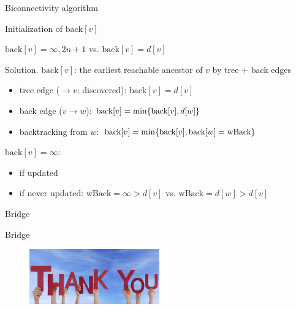 \begin{frame}{Biconnectivity algorithm}
  \begin{exampleblock}{Initialization of $\text{back}[v]$ }
    \begin{center}
      $\text{back}[v] = \infty, 2n+1$ vs. $\text{back}[v] = d[v]$
    \end{center}
  \end{exampleblock}

  \begin{block}{Solution.}
    $\text{back}[v]$: the earliest reachable ancestor of $v$ by tree + back edges
    \begin{itemize}
      \item tree edge ($\to v$; discovered): $\text{back}[v] = d[v]$
      \item back edge ($v \to w$): $\text{back}[v] = \min \{\text{back}[v], d[w]\}$
      \item backtracking from $w$: $\text{back}[v] = \min \{\text{back}[v], \text{back}[w] = \text{wBack}\}$
    \end{itemize}

    $\text{back}[v] = \infty$:
    \begin{itemize}
      \item if updated
      \item if never updated: $\text{wBack} = \infty > d[v]$ vs. $\text{wBack} = d[w] > d[v]$
    \end{itemize}
  \end{block}
\end{frame}
\begin{frame}{Bridge}
  \begin{exampleblock}{Bridge }
    
  \end{exampleblock}
\end{frame}
\begin{frame}[plain]
  \begin{figure}[t]
    \centering
    \includegraphics[width = 0.50\textwidth]{figures/thankyou.jpg}
  \end{figure}
\end{frame}
